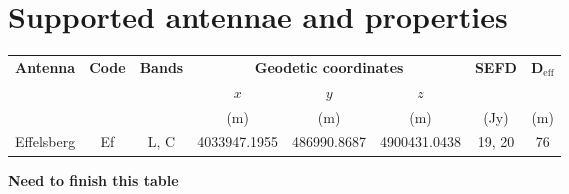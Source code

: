 \documentclass[11pt]{report_jfr}
\begin{document}
\section{Supported antennae and properties}\label{a:supported_antennae}

\begin{longtable}{cccccccc}
	\toprule
	\textbf{Antenna} & \textbf{Code} & \textbf{Bands} & \multicolumn{3}{c}{\textbf{Geodetic coordinates}} & \textbf{SEFD} & $\boldsymbol{D}_\mathrm{eff}$\\
	& & & $x$ & $y$ & $z$ & & \\
	& & & (m) & (m) & (m) & (Jy) & (m) \\
	\hline\endhead
	Effelsberg & Ef & L, C & 4033947.1955 & 486990.8687 & 4900431.0438 & 19, 20 & 76 \\
	\bottomrule
\end{longtable}
\textbf{Need to finish this table}
\end{document}
